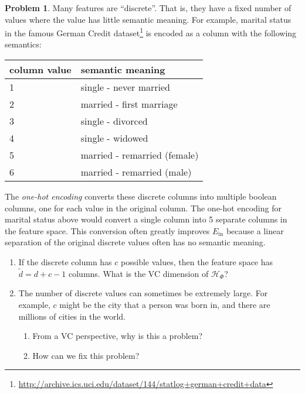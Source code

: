 \documentclass[10pt]{exam}
\theoremstyle{definition}
\newtheorem{problem}{Problem}
\newcommand{\Ein}{E_{\text{in}}}
\newcommand{\HH}[1]{\mathcal H_{\text{#1}}}
\begin{document}
\begin{problem}
    Many features are ``discrete''.
    That is, they have a fixed number of values where the value has little semantic meaning.
    For example, marital status in the famous German Credit dataset\footnote{\url{http://archive.ics.uci.edu/dataset/144/statlog+german+credit+data}} is encoded as a column with the following semantics:

    \vspace{0.15in}
    \begin{tabular}{ll}
        \toprule
        column value & semantic meaning \\
        \midrule
        1 & single - never married \\
        2 & married - first marriage \\
        3 & single - divorced \\
        4 & single - widowed \\
        5 & married - remarried (female) \\ 
        6 & married - remarried (male) \\ 
        \bottomrule
    \end{tabular}

    \vspace{0.15in}
    \noindent
    The \emph{one-hot encoding} converts these discrete columns into multiple boolean columns, one for each value in the original column.
    The one-hot encoding for marital status above would convert a single column into 5 separate columns in the feature space.
    This conversion often greatly improves $\Ein$ because a linear separation of the original discrete values often has no semantic meaning.
    \begin{enumerate}
        \item 
            If the discrete column has $c$ possible values,
            then the feature space has $	\tilde d = d + c - 1$ columns.
            What is the VC dimension of $\HH{$\Phi$}$?
            \vspace{1.5in}

        \item
            The number of discrete values can sometimes be extremely large.
            For example, $c$ might be the city that a person was born in, and there are millions of cities in the world.
            \begin{enumerate}
            \item From a VC perspective, why is this a problem?
                \vspace{1.5in}
            \item How can we fix this problem?
            \end{enumerate}
    \end{enumerate}
\end{problem}
\end{document}
